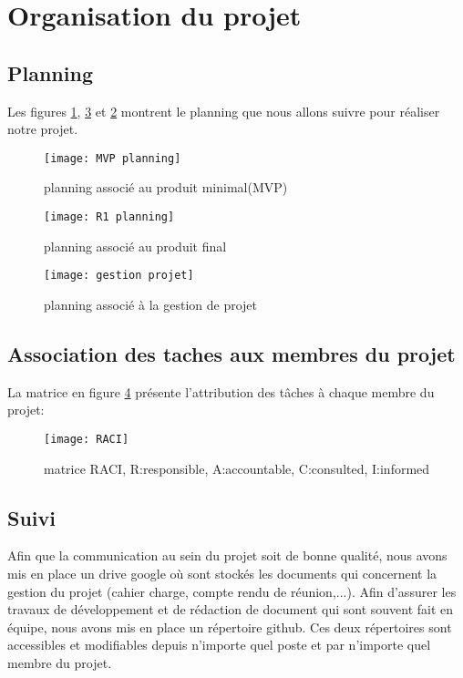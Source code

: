 \chapter*{Organisation du projet}
\label{sec:organisation}
\section*{Planning}
Les figures \ref{fig:mvp-plan}, \ref{fig:gestion-proj} et \ref{fig:r1-plan} montrent le planning que nous allons suivre pour réaliser notre projet.

\begin{figure}[!ht]
	\centering
	\texttt{[image: MVP planning]}
	\caption{planning associé au produit minimal(MVP)}
	\label{fig:mvp-plan}
\end{figure}

\begin{figure}[!ht]
	\centering
	\texttt{[image: R1 planning]}
	\caption{planning associé au produit final}
	\label{fig:r1-plan}
\end{figure}

\begin{figure}[!ht]
	\centering
	\texttt{[image: gestion projet]}
	\caption{planning associé à la gestion de projet}
	\label{fig:gestion-proj}
\end{figure}

\section*{Association des taches aux membres du projet}
La matrice en figure \ref{fig:raci} présente l'attribution des tâches à chaque membre du projet:


\begin{figure}[!h]
	\centering
	\texttt{[image: RACI]}
	\caption{matrice RACI, R:responsible, A:accountable, C:consulted, I:informed}
	\label{fig:raci}
\end{figure}
\section*{Suivi}
Afin que la communication au sein du projet soit de bonne qualité, nous avons mis en place un drive google où sont stockés les documents qui concernent la gestion du projet (cahier charge, compte rendu de réunion,...). Afin d'assurer les travaux de développement et de rédaction de document qui sont souvent fait en équipe, nous avons mis en place un répertoire github. Ces deux répertoires sont accessibles et modifiables depuis n'importe quel poste et par n'importe quel membre du projet. 

